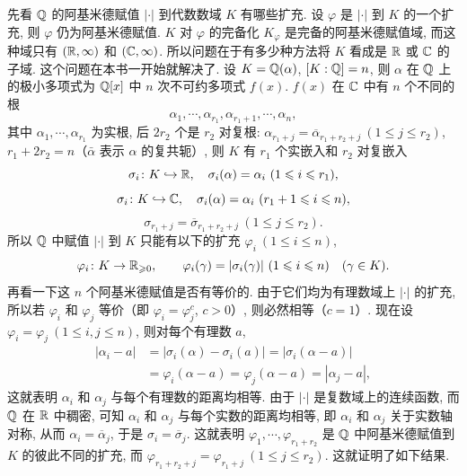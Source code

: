 先看 $\mathbb{Q}$ 的阿基米德赋值 $|\cdot|$ 到代数数域 $K$ 有哪些扩充. 设 $\varphi$ 是 $|\cdot|$ 到 $K$ 的一个扩充, 则 $\varphi$ 仍为阿基米德赋值. $K$ 对 $\varphi$ 的完备化 $K_{\varphi}$ 是完备的阿基米德赋值域, 而这种域只有 $(\mathbb{R},\infty)$ 和 $(\mathbb{C},\infty)$. 所以问题在于有多少种方法将 $K$ 看成是 $\mathbb{R}$ 或 $\mathbb{C}$ 的子域. 这个问题在本书一开始就解决了. 设 $K=\mathbb{Q}(\alpha)$, $[K:\mathbb{Q}]=n$, 则 $\alpha$ 在 $\mathbb{Q}$ 上的极小多项式为 $\mathbb{Q}[x]$ 中 $n$ 次不可约多项式 $f(x)$. $f(x)$ 在 $\mathbb{C}$ 中有 $n$ 个不同的根
\[
  \alpha_1,\cdots,\alpha_{r_1},\alpha_{r_1+1},\cdots,\alpha_n,
\]
其中 $\alpha_1,\cdots,\alpha_{r_1}$ 为实根, 后 $2r_2$ 个是 $r_2$ 对复根: $\alpha_{r_1+j}=\overline{\alpha}_{r_1+r_2+j}\ (1\leqslant j\leqslant r_2)$, $r_1+2r_2=n$（$\bar{\alpha}$ 表示 $\alpha$ 的复共轭）, 则 $K$ 有 $r_1$ 个实嵌入和 $r_2$ 对复嵌入
\[
  \sigma_i\colon K\hookrightarrow\mathbb{R},\quad\sigma_i(\alpha)=\alpha_i\ (1\leqslant i\leqslant r_1),
\]
\[
  \sigma_i\colon K\hookrightarrow\mathbb{C},\quad\sigma_i(\alpha)=\alpha_i\ (r_1+1\leqslant i\leqslant n),
\]
\[
  \sigma_{r_1+j}=\overline{\sigma}_{r_1+r_2+j}\ (1\leqslant j\leqslant r_2).
\]
所以 $\mathbb{Q}$ 中赋值 $|\cdot|$ 到 $K$ 只能有以下的扩充 $\varphi_i\ (1\leqslant i\leqslant n)$,
\[
  \varphi_i\colon K\to\mathbb{R}_{\geqslant 0},\qquad
  \varphi_i(\gamma)=|\sigma_i(\gamma)|\ (1\leqslant i\leqslant n)\quad(\gamma\in K).
\]
再看一下这 $n$ 个阿基米德赋值是否有等价的. 由于它们均为有理数域上 $|\cdot|$ 的扩充, 所以若 $\varphi_i$ 和 $\varphi_j$ 等价（即 $\varphi_i=\varphi_j^c$, $c>0$）, 则必然相等（$c=1$）. 现在设 $\varphi_i=\varphi_j\ (1\leqslant i,j\leqslant n)$, 则对每个有理数 $a$,
\begin{align*}
  |\alpha_i-a|&=|\sigma_i(\alpha)-\sigma_i(a)|=|\sigma_i(\alpha-a)|\\
  &=\varphi_i(\alpha-a)=\varphi_j(\alpha-a)=|\alpha_j-a|,
\end{align*}
这就表明 $\alpha_i$ 和 $\alpha_j$ 与每个有理数的距离均相等. 由于 $|\cdot|$ 是复数域上的连续函数, 而 $\mathbb{Q}$ 在 $\mathbb{R}$ 中稠密, 可知 $\alpha_i$ 和 $\alpha_j$ 与每个实数的距离均相等, 即 $\alpha_i$ 和 $\alpha_j$ 关于实数轴对称, 从而 $\alpha_i=\overline{\alpha}_j$, 于是 $\sigma_i=\overline{\sigma}_j$. 这就表明 $\varphi_1,\cdots,\varphi_{r_1+r_2}$ 是 $\mathbb{Q}$ 中阿基米德赋值到 $K$ 的彼此不同的扩充, 而 $\varphi_{r_1+r_2+j}=\varphi_{r_1+j}\ (1\leqslant j\leqslant r_2)$. 这就证明了如下结果.

